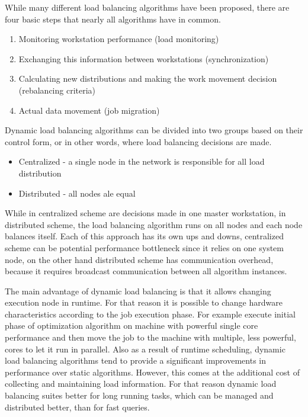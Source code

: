 While many different load balancing algorithms have been proposed, there are four basic steps that nearly all algorithms have in common\cite{malik2000dynamic}.
\begin{enumerate}
    \item Monitoring workstation performance (load monitoring)
    \item Exchanging this information between workstations (synchronization)
    \item Calculating new distributions and making the work movement decision (rebalancing criteria)
    \item Actual data movement (job migration)
\end{enumerate}
Dynamic load balancing algorithms can be divided into two groups based on their control form,
or in other words, where load balancing decisions are made\cite{malik2000dynamic}.
\begin{itemize}
    \item Centralized - a single node in the network is responsible for all load distribution
    \item Distributed - all nodes ale equal
\end{itemize}
While in centralized scheme are decisions made in one master workstation,
in distributed scheme, the load balancing algorithm runs on all nodes
and each node balances itself.
Each of this approach has its own ups and downs,
centralized scheme can be potential performance bottleneck
since it relies on one system node,
on the other hand distributed scheme has communication overhead,
because it requires broadcast communication between all algorithm instances.

The main advantage of dynamic load balancing is that it allows changing execution node in runtime.
For that reason it is possible to change hardware characteristics according to the job execution phase.
For example execute initial phase of optimization algorithm on machine with powerful single core performance
and then move the job to the machine with multiple, less powerful, cores to let it run in parallel.
Also as a result of runtime scheduling,
dynamic load balancing algorithms tend to provide a significant improvements in performance over static algorithms.
However, this comes at the additional cost of collecting and maintaining load information\cite{malik2000dynamic}.
For that reason dynamic load balancing suites better for long running tasks, which can be managed and distributed better, than for fast queries.


